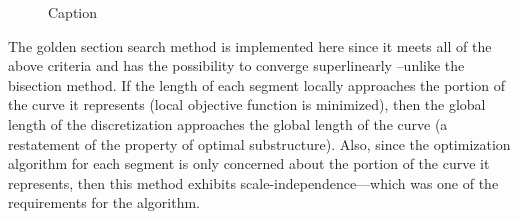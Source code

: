 \begin{figure}[h!]
  \caption{\label{OptimizationFunctionExample} Caption}
\end{figure}

The golden section search method is implemented here since it meets all of 
the above criteria and has the possibility to converge superlinearly 
\cite{brent73}--unlike the bisection method.  If the length of each 
segment locally approaches the portion of the curve it represents (local 
objective function is minimized), then the global length of the 
discretization approaches the global length of the curve (a restatement of 
the property of optimal substructure).  Also, since the optimization 
algorithm for each segment is only concerned about the portion of the 
curve it represents, then this method exhibits scale-independence—which 
was one of the requirements for the algorithm.

